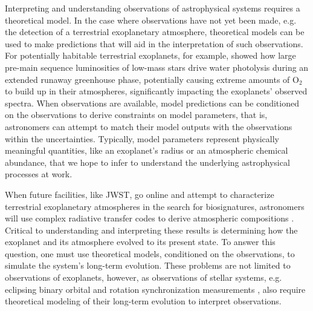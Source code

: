 Interpreting and understanding observations of astrophysical systems requires a theoretical model.  In the case where observations have not yet been made, e.g. the detection of a terrestrial exoplanetary atmosphere, theoretical models can be used to make predictions that will aid in the interpretation of such observations.  For potentially habitable terrestrial exoplanets, for example, \citet{Luger2015} showed how large pre-main sequence luminosities of low-mass stars drive water photolysis during an extended runaway greenhouse phase, potentially causing extreme amounts of O$_2$ to build up in their atmospheres, significantly impacting the exoplanets' observed spectra.  When observations are available, model predictions can be conditioned on the observations to derive constraints on model parameters, that is, astronomers can attempt to match their model outputs with the observations within the uncertainties. Typically, model parameters represent physically meaningful quantities, like an exoplanet's radius or an atmospheric chemical abundance, that we hope to infer to understand the underlying astrophysical processes at work.

When future facilities, like JWST, go online and attempt to characterize terrestrial exoplanetary atmospheres in the search for biosignatures, astronomers will use complex radiative transfer codes to derive atmospheric compositions \citep[e.g. SMART;][]{Meadows1996,Crisp1997}. Critical to understanding and interpreting these results is determining how the exoplanet and its atmosphere evolved to its present state. To answer this question, one must use theoretical models, conditioned on the observations, to simulate the system's long-term evolution.  These problems are not limited to observations of exoplanets, however, as observations of stellar systems, e.g. \kepler eclipsing binary orbital and rotation synchronization measurements \citep{Lurie2017}, also require theoretical modeling of their long-term evolution to interpret observations.

